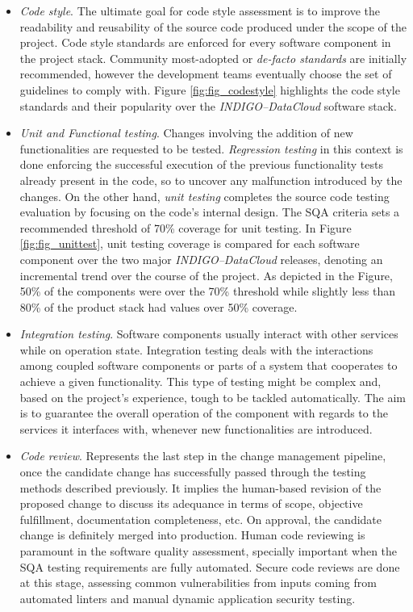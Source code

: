 \documentclass[journal]{IEEEtran}
\begin{document}
\begin{itemize}
\item \textit{Code style}.
The ultimate goal for code style assessment is to improve the readability and reusability of the source code produced under the scope of the
project. Code style standards are enforced for every software component in the project stack. Community
most-adopted or \textit{de-facto standards} are initially recommended, however the development teams eventually
choose the set of guidelines to comply with.  Figure \ref{fig:fig_codestyle} highlights the code style standards and their popularity
over the {\sl INDIGO--DataCloud} software stack.

\item \textit{Unit and Functional testing}.
Changes involving the addition of new functionalities are requested to be tested. \textit{Regression
testing} in this context is done enforcing the successful execution of the previous
functionality tests already present in the code, so to uncover any malfunction introduced by
the changes. On the other hand, \textit{unit testing} completes the source code testing evaluation by
focusing on the code's internal design. The SQA criteria sets a recommended threshold of
70\% coverage for unit testing. In Figure \ref{fig:fig_unittest}, unit testing coverage is compared
for each software component over the two major {\sl INDIGO--DataCloud} releases, denoting an incremental 
trend over the course of the project. As depicted in the Figure, 50\% of the components were over the
70\% threshold while slightly less than 80\% of the product stack had values over 50\% coverage.

\item \textit{Integration testing}. Software components usually interact with other services while on
operation state. Integration testing deals with the interactions among coupled software components or
parts of a system that cooperates to achieve a given functionality. This type of testing might be 
complex and, based on the project's experience, tough to be tackled automatically. The aim is to 
guarantee the overall operation of the component with regards to the services it interfaces with,
whenever new functionalities are introduced.

\item \textit{Code review}.
Represents the last step in the change management pipeline, once the candidate change has 
successfully passed through the testing methods described previously. It implies the human-based
revision of the proposed change to discuss its adequance in terms of scope, objective fulfillment, 
documentation completeness, etc. On approval, the candidate change is definitely merged into
production. Human code reviewing is paramount in the software quality assessment, specially 
important when the SQA testing requirements are fully automated. Secure code reviews are
done at this stage, assessing common vulnerabilities from inputs coming from automated linters
and manual dynamic application security testing.


\end{itemize}
\end{document}
